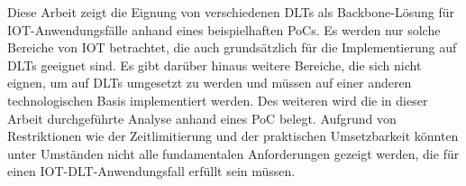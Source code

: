 \documentclass[
    ngerman,american
    ]{scrartcl}
\newcommand{\lang}{de}
\begin{document}
\begin{description}[style=unboxed]
	\item [\questionFour{\lang}]

	Diese Arbeit zeigt die Eignung von verschiedenen DLTs als Backbone-Lösung für IOT-Anwendungsfälle anhand eines beispielhaften PoCs. Es werden nur solche Bereiche von IOT betrachtet, die auch grundsätzlich für die Implementierung auf DLTs geeignet sind. Es gibt darüber hinaus weitere Bereiche, die sich nicht eignen, um auf DLTs umgesetzt zu werden und müssen auf einer anderen technologischen Basis implementiert werden. Des weiteren wird die in dieser Arbeit durchgeführte Analyse anhand eines PoC belegt. Aufgrund von Restriktionen wie der Zeitlimitierung und der praktischen Umsetzbarkeit könnten unter Umständen nicht alle fundamentalen Anforderungen gezeigt werden, die für einen IOT-DLT-Anwendungsfall erfüllt sein müssen.

\end{description}

\newpage

\sectionInitialTOC{\lang}
\sectionInitialTOCDescription{\lang}
\end{document}
